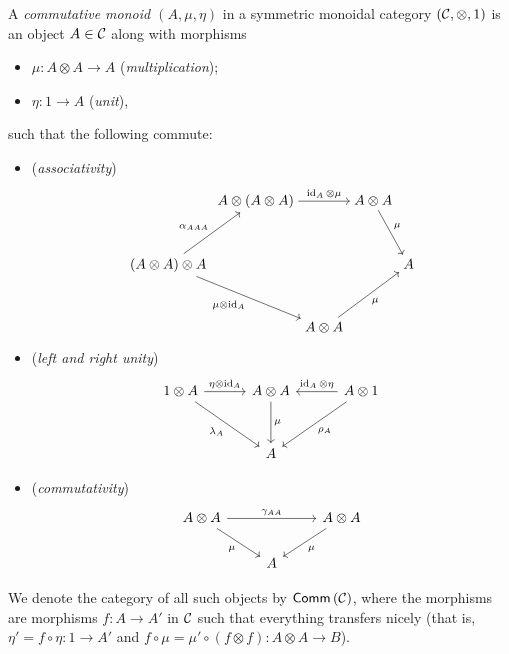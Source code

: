         \begin{definition}\label{df:comm-c}
            A \emph{commutative monoid $(A,\mu,\eta)$} in a symmetric monoidal category $(\mathcal{C},\otimes,1)$ is an object $A\in\mathcal{C}$ along with morphisms
            \begin{itemize}
                \item $\mu\colon A\otimes A\to A$ (\emph{multiplication});
                \item $\eta\colon1\to A$ (\emph{unit}),
            \end{itemize}
            such that the following commute:
            \begin{itemize}
                \item (\emph{associativity})
                    \begin{equation*}
                        \begin{tikzcd}[column sep=0.2em, row sep=3em, cramped]
                            & A\otimes(A\otimes A) \arrow[rr, "\id_A\otimes\mu"] & & A\otimes A \arrow[dr, "\mu"] &\\
                            (A\otimes A)\otimes A \arrow[ur, "\alpha_{AAA}"] \arrow[drr, "\mu\otimes\id_A", swap] & & & & A \\
                             & & A\otimes A \arrow[urr, "\mu", swap] & &
                        \end{tikzcd}
                    \end{equation*}
                \item (\emph{left and right unity})
                    \begin{equation*}
                        \begin{tikzcd}[column sep=3em, row sep=3em]
                            1\otimes A \arrow[r, "\eta\otimes\id_A"] \arrow[dr, swap, "\lambda_A"] & A\otimes A \arrow[d, "\mu"] & A\otimes1 \arrow[l, swap, "\id_A\otimes\eta"] \arrow[dl, "\rho_A"]\\
                             & A &
                        \end{tikzcd}
                    \end{equation*}
                \item (\emph{commutativity})
                    \begin{equation*}
                        \begin{tikzcd}
                            A\otimes A \arrow[rr, "\gamma_{AA}"] \arrow[dr, swap, "\mu"] & & A\otimes A \arrow[dl, "\mu"]\\
                             & A &
                        \end{tikzcd}
                    \end{equation*}
            \end{itemize}

            We denote the category of all such objects by $\mathsf{Comm}\left({\mathcal{C}}\right)$, where the morphisms are morphisms $f\colon A\to A'$ in $\mathcal{C}$ such that everything transfers nicely (that is, $\eta'=f\circ\eta\colon1\to A'$ and $f\circ\mu=\mu'\circ (f\otimes f)\colon A\otimes A\to B$).
        \end{definition}

